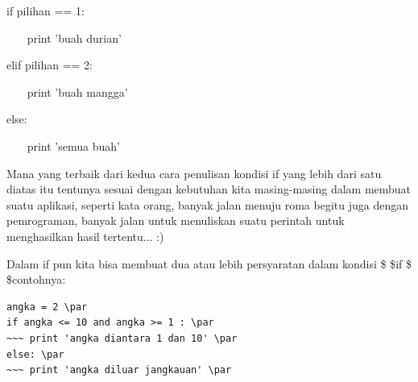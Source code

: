 \noindent 
if pilihan == 1: \par
\vspace{12pt}
\noindent 
~~~ print 'buah durian' \par
\vspace{12pt}
\noindent 
elif pilihan == 2: \par
\vspace{12pt}
\noindent 
~~~ print 'buah mangga' \par
\vspace{12pt}
\noindent 
else: \par
\vspace{12pt}
\noindent 
~~~ print 'semua buah' \par
\vspace{12pt}
\noindent 
Mana yang terbaik dari kedua cara penulisan kondisi if yang lebih dari satu diatas itu tentunya sesuai dengan kebutuhan kita masing-masing dalam membuat suatu aplikasi, seperti kata orang, banyak jalan menuju roma begitu juga dengan pemrograman, banyak jalan untuk menuliskan suatu perintah untuk menghasilkan hasil tertentu... :) \par
\vspace{12pt}
\noindent 
Dalam if pun kita bisa membuat dua atau lebih persyaratan dalam kondisi \$  \$if \$  \$contohnya: \par
\vspace{12pt}
\noindent 
\begin{verbatim}
angka = 2 \par 
if angka <= 10 and angka >= 1 : \par
~~~ print 'angka diantara 1 dan 10' \par
else: \par 
~~~ print 'angka diluar jangkauan' \par
\end{verbatim}
\vspace{12pt}
\vspace{12pt}

